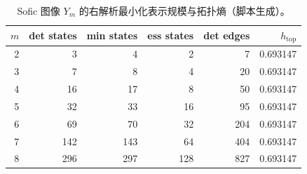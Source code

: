 \begin{table}[H]
\centering
\scriptsize
\setlength{\tabcolsep}{4pt}
\caption{Sofic 图像 $Y_m$ 的右解析最小化表示规模与拓扑熵（脚本生成）。}
\label{tab:phi_m_sofic_entropy}
\begin{tabular}{rrrrrr}
\toprule
$m$ & det states & min states & ess states & det edges & $h_{\mathrm{top}}$\\
\midrule
2 & 3 & 4 & 2 & 7 & 0.693147\\
3 & 7 & 8 & 4 & 20 & 0.693147\\
4 & 16 & 17 & 8 & 50 & 0.693147\\
5 & 32 & 33 & 16 & 95 & 0.693147\\
6 & 69 & 70 & 32 & 204 & 0.693147\\
7 & 142 & 143 & 64 & 404 & 0.693147\\
8 & 296 & 297 & 128 & 827 & 0.693147\\
\bottomrule
\end{tabular}
\end{table}
